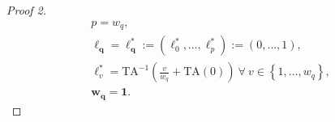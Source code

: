 \documentclass[hidelinks, nonatbib]{elsarticle}
\begin{document}
\begin{lemma}
\begin{proof}[Proof 2]
        \begin{gather}
        p = w_q,
        \\
        \boldsymbol{\ell_q} = 
        \boldsymbol{\ell_{q}^{*}}
        :=
        (
            \ell_{0}^{*}
            ,
            \dots
            ,
            \ell_{p}^{*}
        )
        :=
        (
            0
            ,
            \dots
            ,
            1
        )
        ,
        \\
        \ell_{v}^{*}
        =
        \text{TA}^{-1}\left(
            \frac{v}{w_q}
            +
            \text{TA}(0)
        \right)
        \
        \forall
        \
        v \in 
        \left\{
            1, \dots, w_q
        \right\}
        ,
        \\
        \boldsymbol{w_q} =
        \boldsymbol{1}
        .
        \end{gather}
    \end{proof}
\end{lemma}
\end{document}
